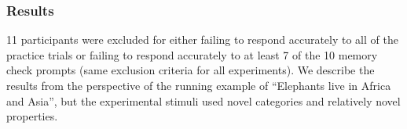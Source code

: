 \documentclass[10pt,letterpaper]{article}
\newcommand{\mh}[1]{{\textcolor{Blue}{[mh: #1]}}}
\begin{document}







\subsubsection{Results}





11 participants were excluded for either failing to respond accurately to all of the practice trials or  failing to respond accurately to at least 7 of the 10 memory check prompts (same exclusion criteria for all experiments).
We describe the results from the perspective of the running example of ``Elephants live in Africa and Asia'', but the experimental stimuli used novel categories and relatively novel properties.
 
\end{document}
